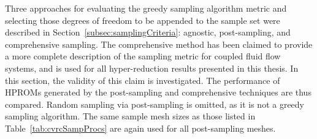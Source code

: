 Three approaches for evaluating the greedy sampling algorithm metric and selecting those degrees of freedom to be appended to the sample set were described in Section~\ref{subsec:samplingCriteria}: agnostic, post-sampling, and comprehensive sampling. The comprehensive method has been claimed to provide a more complete description of the sampling metric for coupled fluid flow systems, and is used for all hyper-reduction results presented in this thesis. In this section, the validity of this claim is investigated. The performance of HPROMs generated by the post-sampling and comprehensive techniques are thus compared. Random sampling via post-sampling is omitted, as it is not a greedy sampling algorithm. The same sample mesh sizes as those listed in Table~\ref{tab:cvrcSampProcs} are again used for all post-sampling meshes. 

